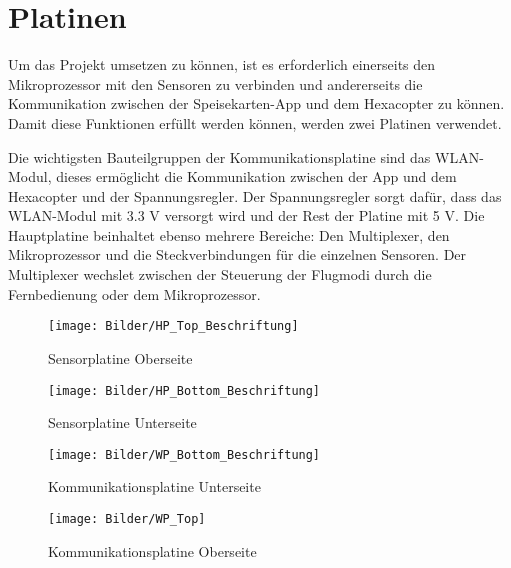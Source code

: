 \section{Platinen}
Um das Projekt umsetzen zu können, ist es erforderlich einerseits den Mikroprozessor mit den Sensoren zu verbinden und andererseits die Kommunikation zwischen der Speisekarten-App und dem Hexacopter zu können.
Damit diese Funktionen erfüllt werden können, werden zwei Platinen verwendet.

Die wichtigsten Bauteilgruppen der Kommunikationsplatine sind das WLAN-Modul, dieses ermöglicht die Kommunikation zwischen der App und dem Hexacopter und der Spannungsregler. Der Spannungsregler sorgt dafür, dass das WLAN-Modul mit 3.3 V versorgt wird und der Rest der Platine mit 5 V.
Die Hauptplatine beinhaltet ebenso mehrere Bereiche: Den Multiplexer, den Mikroprozessor und die Steckverbindungen für die einzelnen Sensoren.
Der Multiplexer wechslet zwischen der Steuerung der Flugmodi durch die Fernbedienung oder dem Mikroprozessor.
\newpage
\begin{figure}[t]
\begin{centering}
\texttt{[image: Bilder/HP\_Top\_Beschriftung]}
\par\end{centering}
\caption{Sensorplatine Oberseite}
\label{Sensor Platine oben}
\end{figure}

\begin{figure}[b]
\begin{centering}
\texttt{[image: Bilder/HP\_Bottom\_Beschriftung]}
\par\end{centering}
\caption{Sensorplatine Unterseite}
\label{Sensor Platine unten}
\end{figure}


\begin{figure}[t]
\begin{centering}
\texttt{[image: Bilder/WP\_Bottom\_Beschriftung]}
\par\end{centering}
\caption{Kommunikationsplatine Unterseite}
\label{WLAN Platine oben}
\end{figure}

\begin{figure}[b]
\begin{centering}
\texttt{[image: Bilder/WP\_Top]}
\par\end{centering}
\caption{Kommunikationsplatine Oberseite}
\label{WLAN Platine unten}
\end{figure}
